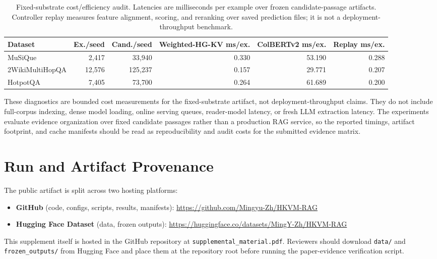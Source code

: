 \documentclass[conference]{IEEEtran}
\newcommand{\whg}{Weighted-HG-KV}
\begin{document}
\begin{table}[t]
\caption{Fixed-substrate cost/efficiency audit. Latencies are milliseconds per example over frozen candidate-passage artifacts. Controller replay measures feature alignment, scoring, and reranking over saved prediction files; it is not a deployment-throughput benchmark.}
\label{tab:supp_cost_efficiency}
\centering
\scriptsize
\setlength{\tabcolsep}{3pt}
\begin{tabular}{lrrrrr}
\toprule
Dataset & Ex./seed & Cand./seed & \whg{} ms/ex. & ColBERTv2 ms/ex. & Replay ms/ex. \\
\midrule
MuSiQue & 2,417 & 33,940 & 0.330 & 53.190 & 0.288 \\
2WikiMultiHopQA & 12,576 & 125,237 & 0.157 & 29.771 & 0.207 \\
HotpotQA & 7,405 & 73,700 & 0.264 & 61.689 & 0.200 \\
\bottomrule
\end{tabular}
\end{table}

These diagnostics are bounded cost measurements for the fixed-substrate artifact, not deployment-throughput claims. They do not include full-corpus indexing, dense model loading, online serving queues, reader-model latency, or fresh LLM extraction latency. The experiments evaluate evidence organization over fixed candidate passages rather than a production RAG service, so the reported timings, artifact footprint, and cache manifests should be read as reproducibility and audit costs for the submitted evidence matrix.

\section{Run and Artifact Provenance}

The public artifact is split across two hosting platforms:

\begin{itemize}
    \item \textbf{GitHub} (code, configs, scripts, results, manifests): \url{https://github.com/Mingyu-Zh/HKVM-RAG}
    \item \textbf{Hugging Face Dataset} (data, frozen outputs): \url{https://huggingface.co/datasets/MingY-Zh/HKVM-RAG}
\end{itemize}

This supplement itself is hosted in the GitHub repository at \texttt{supplemental\_material.pdf}. Reviewers should download \texttt{data/} and \texttt{frozen\_outputs/} from Hugging Face and place them at the repository root before running the paper-evidence verification script.
\end{document}
